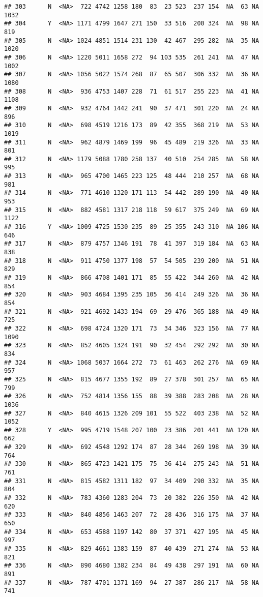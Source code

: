 \documentclass[]{article}
\begin{document}
\begin{verbatim}
## 303      N  <NA>  722 4742 1258 180  83  23 523  237 154  NA  63 NA 1032
## 304      Y  <NA> 1171 4799 1647 271 150  33 516  200 324  NA  98 NA  819
## 305      N  <NA> 1024 4851 1514 231 130  42 467  295 282  NA  35 NA 1020
## 306      N  <NA> 1220 5011 1658 272  94 103 535  261 241  NA  47 NA 1002
## 307      N  <NA> 1056 5022 1574 268  87  65 507  306 332  NA  36 NA 1080
## 308      N  <NA>  936 4753 1407 228  71  61 517  255 223  NA  41 NA 1108
## 309      N  <NA>  932 4764 1442 241  90  37 471  301 220  NA  24 NA  896
## 310      N  <NA>  698 4519 1216 173  89  42 355  368 219  NA  53 NA 1019
## 311      N  <NA>  962 4879 1469 199  96  45 489  219 326  NA  33 NA  801
## 312      N  <NA> 1179 5088 1780 258 137  40 510  254 285  NA  58 NA  995
## 313      N  <NA>  965 4700 1465 223 125  48 444  210 257  NA  68 NA  981
## 314      N  <NA>  771 4610 1320 171 113  54 442  289 190  NA  40 NA  953
## 315      N  <NA>  882 4581 1317 218 118  59 617  375 249  NA  69 NA 1122
## 316      Y  <NA> 1009 4725 1530 235  89  25 355  243 310  NA 106 NA  646
## 317      N  <NA>  879 4757 1346 191  78  41 397  319 184  NA  63 NA  838
## 318      N  <NA>  911 4750 1377 198  57  54 505  239 200  NA  51 NA  829
## 319      N  <NA>  866 4708 1401 171  85  55 422  344 260  NA  42 NA  854
## 320      N  <NA>  903 4684 1395 235 105  36 414  249 326  NA  36 NA  854
## 321      N  <NA>  921 4692 1433 194  69  29 476  365 188  NA  49 NA  725
## 322      N  <NA>  698 4724 1320 171  73  34 346  323 156  NA  77 NA 1090
## 323      N  <NA>  852 4605 1324 191  90  32 454  292 292  NA  30 NA  834
## 324      N  <NA> 1068 5037 1664 272  73  61 463  262 276  NA  69 NA  957
## 325      N  <NA>  815 4677 1355 192  89  27 378  301 257  NA  65 NA  799
## 326      N  <NA>  752 4814 1356 155  88  39 388  283 208  NA  28 NA 1036
## 327      N  <NA>  840 4615 1326 209 101  55 522  403 238  NA  52 NA 1052
## 328      Y  <NA>  995 4719 1548 207 100  23 386  201 441  NA 120 NA  662
## 329      N  <NA>  692 4548 1292 174  87  28 344  269 198  NA  39 NA  764
## 330      N  <NA>  865 4723 1421 175  75  36 414  275 243  NA  51 NA  761
## 331      N  <NA>  815 4582 1311 182  97  34 409  290 332  NA  35 NA  804
## 332      N  <NA>  783 4360 1283 204  73  20 382  226 350  NA  42 NA  620
## 333      N  <NA>  840 4856 1463 207  72  28 436  316 175  NA  37 NA  650
## 334      N  <NA>  653 4588 1197 142  80  37 371  427 195  NA  45 NA  997
## 335      N  <NA>  829 4661 1383 159  87  40 439  271 274  NA  53 NA  821
## 336      N  <NA>  890 4680 1382 234  84  49 438  297 191  NA  60 NA  891
## 337      N  <NA>  787 4701 1371 169  94  27 387  286 217  NA  58 NA  741

\end{verbatim}
\end{document}
